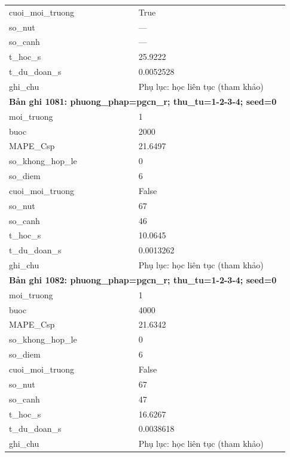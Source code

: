 \begin{longtable}{p{0.43\linewidth}p{0.50\linewidth}}
cuoi\_\allowbreak moi\_\allowbreak truong & True \\
so\_\allowbreak nut & — \\
so\_\allowbreak canh & — \\
t\_\allowbreak hoc\_\allowbreak s & 25.9222 \\
t\_\allowbreak du\_\allowbreak doan\_\allowbreak s & 0.0052528 \\
ghi\_\allowbreak chu & Phụ lục: học liên tục (tham khảo) \\
\midrule
\multicolumn{2}{p{0.95\linewidth}}{\textbf{Bản ghi 1081: phuong\_phap=pgcn\_r; thu\_tu=1-2-3-4; seed=0}} \\
moi\_\allowbreak truong & 1 \\
buoc & 2000 \\
MAPE\_\allowbreak Csp & 21.6497 \\
so\_\allowbreak khong\_\allowbreak hop\_\allowbreak le & 0 \\
so\_\allowbreak diem & 6 \\
cuoi\_\allowbreak moi\_\allowbreak truong & False \\
so\_\allowbreak nut & 67 \\
so\_\allowbreak canh & 46 \\
t\_\allowbreak hoc\_\allowbreak s & 10.0645 \\
t\_\allowbreak du\_\allowbreak doan\_\allowbreak s & 0.0013262 \\
ghi\_\allowbreak chu & Phụ lục: học liên tục (tham khảo) \\
\midrule
\multicolumn{2}{p{0.95\linewidth}}{\textbf{Bản ghi 1082: phuong\_phap=pgcn\_r; thu\_tu=1-2-3-4; seed=0}} \\
moi\_\allowbreak truong & 1 \\
buoc & 4000 \\
MAPE\_\allowbreak Csp & 21.6342 \\
so\_\allowbreak khong\_\allowbreak hop\_\allowbreak le & 0 \\
so\_\allowbreak diem & 6 \\
cuoi\_\allowbreak moi\_\allowbreak truong & False \\
so\_\allowbreak nut & 67 \\
so\_\allowbreak canh & 47 \\
t\_\allowbreak hoc\_\allowbreak s & 16.6267 \\
t\_\allowbreak du\_\allowbreak doan\_\allowbreak s & 0.0038618 \\
ghi\_\allowbreak chu & Phụ lục: học liên tục (tham khảo) \\

\end{longtable}
